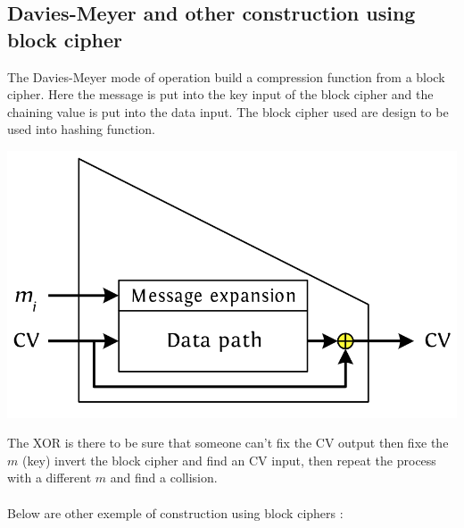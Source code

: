 \documentclass[11pt,a4paper]{report}
\begin{document}
\subsection{Davies-Meyer and other construction using block cipher}
The Davies-Meyer mode of operation build a compression function from a block cipher.
Here the message is put into the key input of the block cipher and the chaining value is put into the data input. The block cipher used are design to be used into hashing function. 
\begin{center}
\includegraphics[scale=0.5]{img/img22.png}
\end{center}
The XOR is there to be sure that someone can't fix the CV output then fixe the $m$ (key) invert the block cipher and find an CV input, then repeat the process with a different $m$ and find a collision.\\
\\
Below are other exemple of construction using block ciphers :
\end{document}

